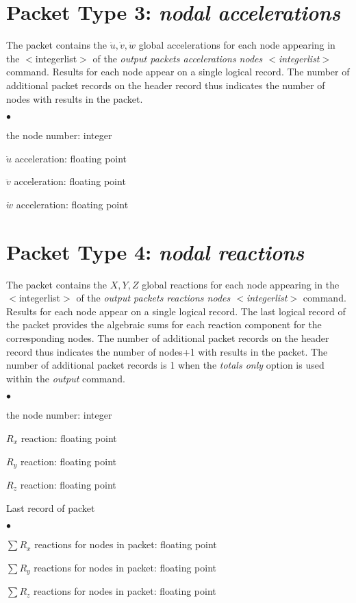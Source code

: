 \documentclass[10pt]{report}
\numberwithin{equation}{section}
\newcommand{\ti}{\emph}
\newcommand{\squishlist}{
 \begin{list}{$\bullet$}
  { \setlength{\itemsep}{0pt}
     \setlength{\parsep}{3pt}
     \setlength{\topsep}{3pt}
     \setlength{\partopsep}{0pt}
     \setlength{\leftmargin}{1.5em}
     \setlength{\labelwidth}{1em}
     \setlength{\labelsep}{0.5em} } }
\newcommand{\squishend}{
  \end{list}  }
\begin{document}
%
%
\section{Packet Type 3: \ti{nodal accelerations}}
The packet contains the $\ddot u, \ddot v, \ddot w$ global accelerations for 
each node appearing in the $<$integerlist$>$ of the \ti{output packets 
accelerations nodes $<$integerlist$>$ } command. Results for each node 
appear on a single logical record. The number of additional packet records 
on the header record thus indicates the number of nodes with results in the packet.
\squishlist
\item the node number:  integer
\item $\ddot u$ acceleration:  floating point
\item $\ddot v$ acceleration:  floating point
\item $\ddot w$ acceleration:  floating point
\squishend

%
%
\section{Packet Type 4: \ti{nodal reactions}}
The packet contains the $X, Y, Z$ global reactions for each node appearing 
in the $<$integerlist$>$ of the \ti{output packets reactions 
nodes $<$integerlist$>$ } command. Results for each node appear on 
a single logical record. The last logical record of the packet provides the 
algebraic sums for each reaction component for the corresponding nodes. 
The number of additional packet records on the header record thus indicates 
the number of nodes+1 with results in the packet.  The number of additional 
packet records is 1 when the \ti{totals only} option is used within 
the \ti{output} command.
\squishlist
\item the node number:  integer
\item $R_x$ reaction:  floating point
\item $R_y$ reaction:  floating point
\item $R_z$ reaction:  floating point
\squishend
\noindent Last record of packet
\squishlist
\item $\sum R_x$ reactions for nodes in packet:  floating point
\item $\sum R_y$ reactions for nodes in packet:  floating point
\item $\sum R_z$ reactions for nodes in packet:  floating point
\squishend
\end{document}
